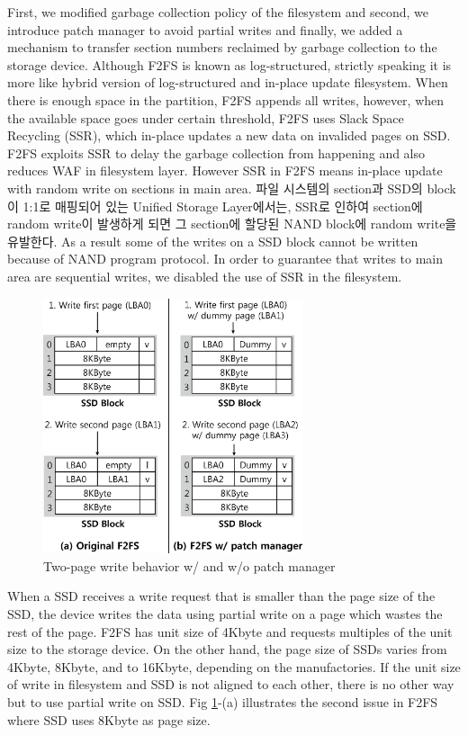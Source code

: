 \documentclass[letterpaper,twocolumn,10pt]{article}
\begin{document}
First, we modified garbage collection policy of the filesystem and second, we introduce patch manager to avoid partial writes and finally, we added a mechanism to transfer section numbers reclaimed by garbage collection to the storage device. Although F2FS is known as log-structured, strictly speaking it is more like hybrid version of log-structured and in-place update filesystem. When there is enough space in the partition, F2FS appends all writes, however, when the available space goes under certain threshold, F2FS uses Slack Space Recycling (SSR), which in-place updates a new data on invalided pages on SSD. F2FS exploits SSR to delay the garbage collection from happening and also reduces WAF in filesystem layer. However SSR in F2FS means in-place update with random write on sections in main area. 파일 시스템의 section과 SSD의 block이 1:1로 매핑되어 있는 Unified Storage Layer에서는, SSR로 인하여 section에 random write이 발생하게 되면 그 section에 할당된 NAND block에 random write을 유발한다. As a result some of the writes on a SSD block cannot be written because of NAND program protocol. In order to guarantee that writes to main area are sequential writes, we disabled the use of SSR in the filesystem.

\begin{figure}[h]
\begin{center}
\includegraphics[width=3in]{./figure/patch_manager_ex}
\caption{Two-page write behavior w/ and w/o patch manager}
\label{fig:patch_manager_ex}
\end{center}
\end{figure}

When a SSD receives a write request that is smaller than the page size of the SSD, the device writes the data using partial write on a page which wastes the rest of the page. F2FS has unit size of 4Kbyte and requests multiples of the unit size to the storage device. On the other hand, the page size of SSDs varies from 4Kbyte, 8Kbyte, and to 16Kbyte, depending on the manufactories. If the unit size of write in filesystem and SSD is not aligned to each other, there is no other way but to use partial write on SSD. Fig \ref{fig:patch_manager_ex}-(a) illustrates the second issue in F2FS where SSD uses 8Kbyte as page size.
\end{document}
